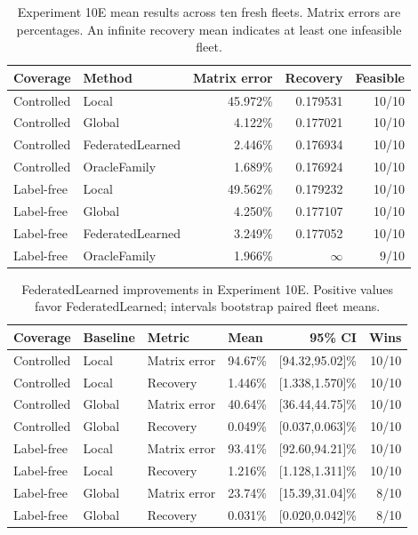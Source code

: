 \begin{table}[htbp]
\centering
\caption{Experiment 10E mean results across ten fresh fleets. Matrix errors are
percentages. An infinite recovery mean indicates at least one infeasible fleet.}
\label{tab:experiment10e-summary}
\begin{tabular}{llrrr}
\toprule
Coverage & Method & Matrix error & Recovery & Feasible\\
\midrule
Controlled & Local              & 45.972\% & 0.179531 & 10/10\\
Controlled & Global             &  4.122\% & 0.177021 & 10/10\\
Controlled & FederatedLearned   &  2.446\% & 0.176934 & 10/10\\
Controlled & OracleFamily       &  1.689\% & 0.176924 & 10/10\\
\midrule
Label-free & Local              & 49.562\% & 0.179232 & 10/10\\
Label-free & Global             &  4.250\% & 0.177107 & 10/10\\
Label-free & FederatedLearned   &  3.249\% & 0.177052 & 10/10\\
Label-free & OracleFamily       &  1.966\% & $\infty$ & 9/10\\
\bottomrule
\end{tabular}
\end{table}

\begin{table}[htbp]
\centering
\caption{FederatedLearned improvements in Experiment 10E. Positive values
favor FederatedLearned; intervals bootstrap paired fleet means.}
\label{tab:experiment10e-comparisons}
\begin{tabular}{llllrr}
\toprule
Coverage & Baseline & Metric & Mean & 95\% CI & Wins\\
\midrule
Controlled & Local  & Matrix error & 94.67\% & [94.32,95.02]\% & 10/10\\
Controlled & Local  & Recovery     & 1.446\% & [1.338,1.570]\% & 10/10\\
Controlled & Global & Matrix error & 40.64\% & [36.44,44.75]\% & 10/10\\
Controlled & Global & Recovery     & 0.049\% & [0.037,0.063]\% & 10/10\\
Label-free & Local  & Matrix error & 93.41\% & [92.60,94.21]\% & 10/10\\
Label-free & Local  & Recovery     & 1.216\% & [1.128,1.311]\% & 10/10\\
Label-free & Global & Matrix error & 23.74\% & [15.39,31.04]\% & 8/10\\
Label-free & Global & Recovery     & 0.031\% & [0.020,0.042]\% & 8/10\\
\bottomrule
\end{tabular}
\end{table}

